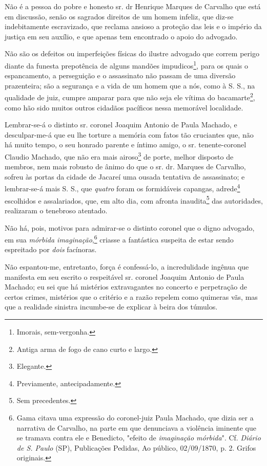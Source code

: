 Não é a pessoa do pobre e honesto sr. dr Henrique Marques de Carvalho
que está em discussão, senão os sagrados direitos de um homem infeliz,
que diz-se indebitamente escravizado, que reclama ansioso a proteção das
leis e o império da justiça em seu auxílio, e que apenas tem encontrado
o apoio do advogado.

Não são os defeitos ou imperfeições físicas do ilustre advogado que
correm perigo diante da funesta prepotência de alguns mandões
impudicos\footnote{Imorais, sem-vergonha.}, para os quais o
espancamento, a perseguição e o assassinato não passam de uma diversão
prazenteira; são a segurança e a vida de um homem que a nós, como à S.
S., na qualidade de juiz, cumpre amparar para que não seja ele vítima do
bacamarte\footnote{Antiga arma de fogo de cano curto e largo.}, como
hão sido muitos outros cidadãos pacíficos nessa memorável localidade.

Lembrar-se-á o distinto sr. coronel Joaquim Antonio de Paula Machado, e
desculpar-me-á que eu lhe torture a memória com fatos tão cruciantes
que, não há muito tempo, o seu honrado parente e íntimo amigo, o sr.
tenente-coronel Claudio Machado, que não era mais airoso\footnote{
  Elegante.} de porte, melhor disposto de membros, nem mais robusto de
ânimo do que o sr. dr. Marques de Carvalho, sofreu às portas da cidade
de Jacareí uma ousada tentativa de assassinato; e lembrar-se-á mais S.
S., que \emph{quatro} foram os formidáveis capangas, adrede\footnote{
  Previamente, antecipadamente.} escolhidos e assalariados, que, em alto
dia, com afronta inaudita\footnote{Sem precedentes.} das autoridades,
realizaram o tenebroso atentado.

Não há, pois, motivos para admirar-se o distinto coronel que o digno
advogado, em sua \emph{mórbida imaginação},\footnote{Gama citava uma
  expressão do coronel-juiz Paula Machado, que dizia ser a narrativa de
  Carvalho, na parte em que denunciava a violência iminente que se
  tramava contra ele e Benedicto, "efeito de \emph{imaginação mórbida}".
  Cf. \emph{Diário de S. Paulo} (SP), Publicações Pedidas, Ao público,
  02/09/1870, p. 2. Grifos originais.} criasse a fantástica suspeita de
estar sendo espreitado por \emph{dois} facínoras.

Não espantou-me, entretanto, força é confessá-lo, a incredulidade
ingênua que manifesta em seu escrito o respeitável sr. coronel Joaquim
Antonio de Paula Machado; eu sei que há mistérios extravagantes no
concerto e perpetração de certos crimes, mistérios que o critério e a
razão repelem como quimeras vãs, mas que a realidade sinistra incumbe-se
de explicar à beira dos túmulos.

